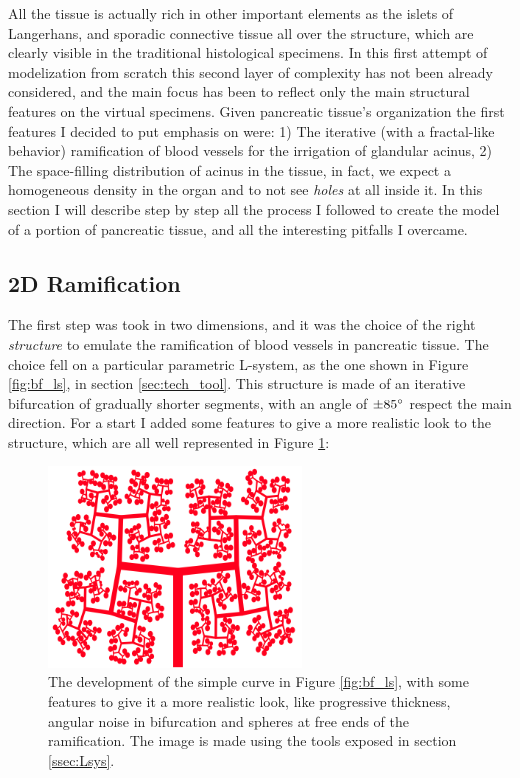 All the tissue is actually rich in other important elements as the islets of Langerhans, and sporadic connective tissue all over the structure, which are clearly visible in the traditional histological specimens. In this first attempt of modelization from scratch this second layer of complexity has not been already considered, and the main focus has been to reflect only the main structural features on the virtual specimens. Given pancreatic tissue's organization the first features I decided to put emphasis on were: 1) The iterative (with a fractal-like behavior) ramification of blood vessels for the irrigation of glandular acinus, 2) The space-filling distribution of acinus in the tissue, in fact, we expect a homogeneous density in the organ and to not see \textit{holes} at all inside it. In this section I will describe step by step all the process I followed to create the model of a portion of pancreatic tissue, and all the interesting pitfalls I overcame.


\subsection{2D Ramification}
    The first step was took in two dimensions, and it was the choice of the right \textit{structure} to emulate the ramification of blood vessels in pancreatic tissue. The choice fell on a particular parametric L-system, as the one shown in Figure \ref{fig:bf_ls}, in section \ref{sec:tech_tool}. This structure is made of an iterative bifurcation of gradually shorter segments, with an angle of $\pm 85 \degree$ respect the main direction. For a start I added some features to give a more realistic look to the structure, which are all well represented in Figure \ref{fig:ram_feat}:

    \begin{figure}
        \centering
        \includegraphics[width = 0.6\textwidth]{images/ram_feat}
        \caption{The development of the simple curve in Figure \ref{fig:bf_ls}, with some features to give it a more realistic look, like progressive thickness, angular noise in bifurcation and spheres at free ends of the ramification. The image is made using the tools exposed in section \ref{ssec:Lsys}.}
        \label{fig:ram_feat}
    \end{figure}

